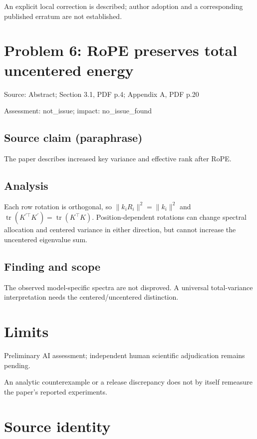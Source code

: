 \documentclass[11pt]{article}
\begin{document}
An explicit local correction is described; author adoption and a corresponding published erratum are not established.

\section*{Problem 6: RoPE preserves total uncentered energy}

Source: Abstract; Section 3.1, PDF p.4; Appendix A, PDF p.20

Assessment: not\_issue; impact: no\_issue\_found

\subsection*{Source claim (paraphrase)}

The paper describes increased key variance and effective rank after RoPE.

\subsection*{Analysis}

Each row rotation is orthogonal, so \(\|k_iR_i\|^2=\|k_i\|^2\) and \(\operatorname{tr}(K^{\prime\top}K^\prime)=\operatorname{tr}(K^\top K)\). Position-dependent rotations can change spectral allocation and centered variance in either direction, but cannot increase the uncentered eigenvalue sum.

\subsection*{Finding and scope}

The observed model-specific spectra are not disproved. A universal total-variance interpretation needs the centered/uncentered distinction.

\section*{Limits}

Preliminary AI assessment; independent human scientific adjudication remains pending.\par

An analytic counterexample or a release discrepancy does not by itself remeasure the paper’s reported experiments.\par

\section*{Source identity}
\end{document}
